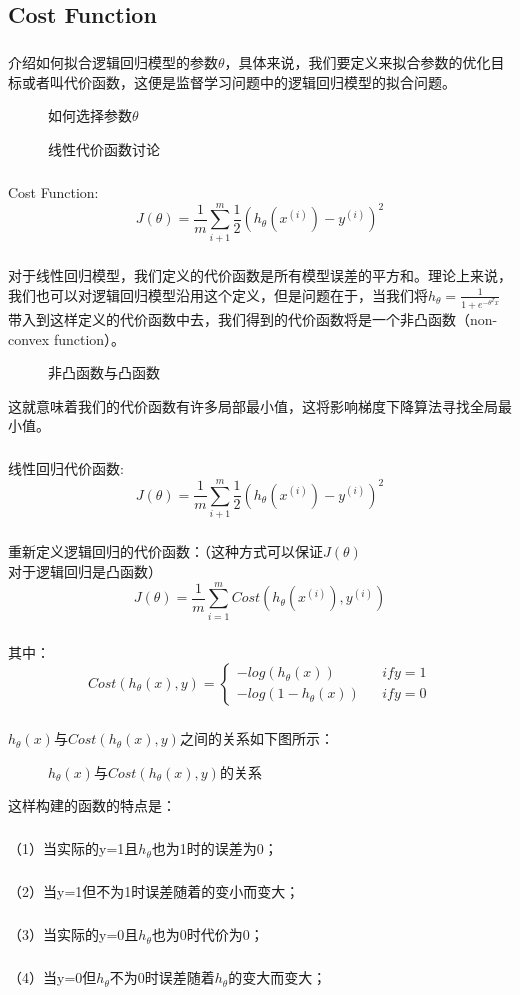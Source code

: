\documentclass{article}
\begin{document}
\begin{CJK}{UTF8}{gbsn}
\subsection{Cost Function}
\subparagraph{}
介绍如何拟合逻辑回归模型的参数$\theta$，具体来说，我们要定义来拟合参数的优化目标或者叫代价函数，这便是监督学习问题中的逻辑回归模型的拟合问题。
\begin{figure}[H]
\caption{如何选择参数$\theta$}
\label{fig:321}
\end{figure}
\begin{figure}[H]
\caption{线性代价函数讨论}
\label{fig:322}
\end{figure}
\subparagraph{}
Cost Function:
\begin{equation}
J(\theta)=\frac{1}{m}\sum_{i+1}^m\frac{1}{2}{(h_\theta(x^{(i)})-y^{(i)})}^2
\end{equation}
\subparagraph{}
对于线性回归模型，我们定义的代价函数是所有模型误差的平方和。理论上来说，我们也可以对逻辑回归模型沿用这个定义，但是问题在于，当我们将$h_\theta=\frac{1}{1+e^{-\theta^Tx}}$带入到这样定义的代价函数中去，我们得到的代价函数将是一个非凸函数（non-convex function）。
\begin{figure}[H]
\caption{非凸函数与凸函数}
\label{fig:323}
\end{figure}
这就意味着我们的代价函数有许多局部最小值，这将影响梯度下降算法寻找全局最小值。
\subparagraph{}
线性回归代价函数:
\begin{equation}
J(\theta)=\frac{1}{m}\sum_{i+1}^m\frac{1}{2}{(h_\theta(x^{(i)})-y^{(i)})}^2
\end{equation}
\subparagraph{}
重新定义逻辑回归的代价函数：（这种方式可以保证$J(\theta)$对于逻辑回归是凸函数）
\begin{equation}
J(\theta)=\frac{1}{m}\sum_{i=1}^mCost(h_\theta(x^{(i)}),y^{(i)})
\end{equation}
\subparagraph{}
其中：
\begin{equation}
Cost(h_\theta(x),y)=\left\{\begin{array}{rcl}
-log(h_\theta(x))  &    &{if y=1}\\
-log(1-h_\theta(x)) &   & {if y=0}
\end{array}\right.
\end{equation}
\subparagraph{}
$h_\theta(x)$与$Cost(h_\theta(x),y)$之间的关系如下图所示：
\begin{figure}[H]
\caption{$h_\theta(x)$与$Cost(h_\theta(x),y)$的关系}
\label{fig:324}
\end{figure}
这样构建的函数的特点是：
\subparagraph{}
（1）当实际的y=1且$h_\theta$也为1时的误差为0；
\subparagraph{}
（2）当y=1但不为1时误差随着的变小而变大；
\subparagraph{}
（3）当实际的y=0且$h_\theta$也为0时代价为0；
\subparagraph{}
（4）当y=0但$h_\theta$不为0时误差随着$h_\theta$的变大而变大；

\end{CJK}
\end{document}

